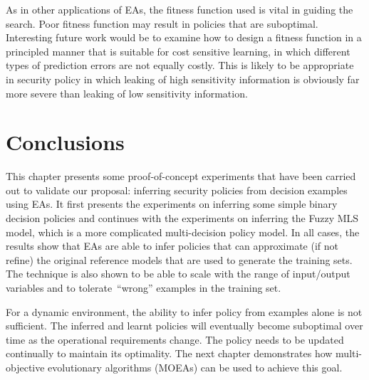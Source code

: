 As in other applications of EAs, the fitness function used is vital in
guiding the search. Poor fitness function may result in policies that
are suboptimal. Interesting future work would be to examine how to
design a fitness function in a principled manner that is suitable for
cost sensitive learning, in which different types of prediction errors
are not equally costly. This is likely to be appropriate in security
policy in which leaking of high sensitivity information is obviously
far more severe than leaking of low sensitivity information.

\section{Conclusions}
\label{sec:conclusion5}
This chapter presents some proof-of-concept experiments that have been
carried out to validate our proposal: inferring security policies from
decision examples using EAs. It first presents the experiments on
inferring some simple binary decision policies and continues with the
experiments on inferring the Fuzzy MLS model, which is a more
complicated multi-decision policy model. In all cases, the results
show that EAs are able to infer policies that can approximate (if not
refine) the original reference models that are used to generate the
training sets. The technique is also shown to be able to scale with
the range of input/output variables and to tolerate~``wrong'' examples
in the training set.

For a dynamic environment, the ability to infer policy from examples
alone is not sufficient. The inferred and learnt policies will
eventually become suboptimal over time as the operational requirements
change. The policy needs to be updated continually to maintain its
optimality. The next chapter demonstrates how multi-objective
evolutionary algorithms (MOEAs) can be used to achieve this goal.
